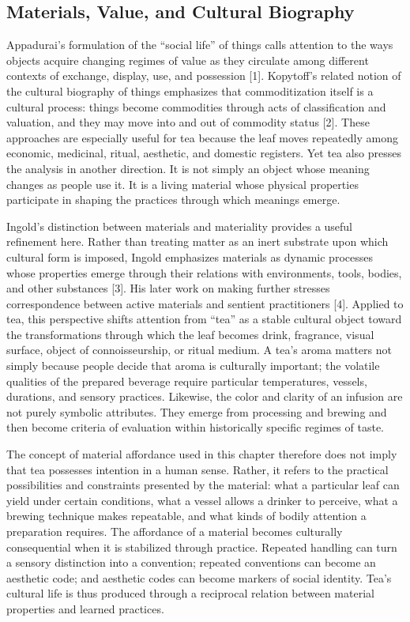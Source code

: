 \documentclass[11pt,a4paper]{article}
\begin{document}
\subsection{Materials, Value, and Cultural Biography}

Appadurai's formulation of the ``social life'' of things calls attention to the ways objects acquire changing regimes of value as they circulate among different contexts of exchange, display, use, and possession [1]. Kopytoff's related notion of the cultural biography of things emphasizes that commoditization itself is a cultural process: things become commodities through acts of classification and valuation, and they may move into and out of commodity status [2]. These approaches are especially useful for tea because the leaf moves repeatedly among economic, medicinal, ritual, aesthetic, and domestic registers. Yet tea also presses the analysis in another direction. It is not simply an object whose meaning changes as people use it. It is a living material whose physical properties participate in shaping the practices through which meanings emerge.

Ingold's distinction between materials and materiality provides a useful refinement here. Rather than treating matter as an inert substrate upon which cultural form is imposed, Ingold emphasizes materials as dynamic processes whose properties emerge through their relations with environments, tools, bodies, and other substances [3]. His later work on making further stresses correspondence between active materials and sentient practitioners [4]. Applied to tea, this perspective shifts attention from ``tea'' as a stable cultural object toward the transformations through which the leaf becomes drink, fragrance, visual surface, object of connoisseurship, or ritual medium. A tea's aroma matters not simply because people decide that aroma is culturally important; the volatile qualities of the prepared beverage require particular temperatures, vessels, durations, and sensory practices. Likewise, the color and clarity of an infusion are not purely symbolic attributes. They emerge from processing and brewing and then become criteria of evaluation within historically specific regimes of taste.

The concept of material affordance used in this chapter therefore does not imply that tea possesses intention in a human sense. Rather, it refers to the practical possibilities and constraints presented by the material: what a particular leaf can yield under certain conditions, what a vessel allows a drinker to perceive, what a brewing technique makes repeatable, and what kinds of bodily attention a preparation requires. The affordance of a material becomes culturally consequential when it is stabilized through practice. Repeated handling can turn a sensory distinction into a convention; repeated conventions can become an aesthetic code; and aesthetic codes can become markers of social identity. Tea's cultural life is thus produced through a reciprocal relation between material properties and learned practices.
\end{document}
